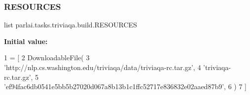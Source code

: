 \subsubsection{\texorpdfstring{R\+E\+S\+O\+U\+R\+C\+ES}{RESOURCES}}
{\footnotesize\ttfamily list parlai.\+tasks.\+triviaqa.\+build.\+R\+E\+S\+O\+U\+R\+C\+ES}

{\bfseries Initial value\+:}
\begin{DoxyCode}
1 =  [
2     DownloadableFile(
3         \textcolor{stringliteral}{'http://nlp.cs.washington.edu/triviaqa/data/triviaqa-rc.tar.gz'},
4         \textcolor{stringliteral}{'triviaqa-rc.tar.gz'},
5         \textcolor{stringliteral}{'ef94fac6db0541e5bb5b27020d067a8b13b1c1ffc52717e836832e02aaed87b9'},
6     )
7 ]
\end{DoxyCode}
